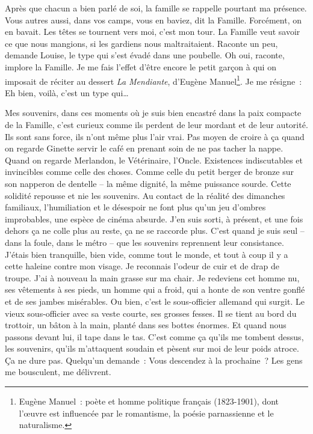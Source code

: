{

Après que chacun a bien parlé de soi, la famille se rappelle pourtant
ma présence. Vous autres aussi, dans vos camps, vous en baviez, dit
la Famille. Forcément, on en bavait. Les têtes se tournent vers moi,
c'est mon tour. La Famille veut savoir ce que nous mangions, si les
gardiens nous maltraitaient. Raconte un peu, demande Louise, le type
qui s'est évadé dans une poubelle. Oh oui, raconte, implore la
Famille. Je me fais l'effet d'être encore le petit garçon à qui on
imposait de réciter au dessert \textit{La Mendiante}, d'Eugène
Manuel\footnote{Eugène Manuel~: poète et homme politique français
(1823-1901), dont l'œuvre est influencée par le romantisme, la poésie
parnassienne et le naturalisme.}. Je me résigne~: Eh bien, voilà,
c'est un type qui…

Mes souvenirs, dans ces moments où je suis bien encastré dans la paix
compacte de la Famille, c'est curieux comme ils perdent de leur
mordant et de leur autorité. Ils sont sans force, ils n'ont même plus
l'air vrai. Pas moyen de croire à ça quand on regarde Ginette servir
le café en prenant soin de ne pas tacher la nappe. Quand on regarde
Merlandon, le Vétérinaire, l'Oncle. Existences indiscutables et
invincibles comme celle des choses. Comme celle du petit berger de
bronze sur son napperon de dentelle – la même dignité, la même
puissance sourde. Cette solidité repousse et nie les souvenirs. Au
contact de la réalité des dimanches familiaux, l'humiliation et le
désespoir ne font plus qu'un jeu d'ombres improbables, une espèce de
cinéma absurde. J'en suis sorti, à présent, et une fois dehors ça ne
colle plus au reste, ça ne se raccorde plus. C'est quand je suis seul
– dans la foule, dans le métro – que les souvenirs reprennent leur
consistance. J'étais bien tranquille, bien vide, comme tout le monde,
et tout à coup il y a cette haleine contre mon visage. Je reconnais
l'odeur de cuir et de drap de troupe. J'ai à nouveau la main grasse
sur ma chair. Je redeviens cet homme nu, ses vêtements à ses pieds,
un homme qui a froid, qui a honte de son ventre gonflé et de ses
jambes misérables. Ou bien, c'est le sous-officier allemand qui
surgit. Le vieux sous-officier avec sa veste courte, ses grosses
fesses. Il se tient au bord du trottoir, un bâton à la main, planté
dans ses bottes énormes. Et quand nous passons devant lui, il tape
dans le tas. C'est comme ça qu'ils me tombent dessus, les souvenirs,
qu'ils m'attaquent soudain et pèsent sur moi de leur poids atroce. Ça
ne dure pas. Quelqu'un demande~: Vous descendez à la prochaine~? Les
gens me bousculent, me délivrent.

}
